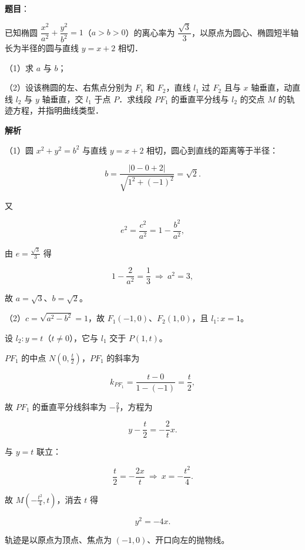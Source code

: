 \begin{answer}

\textbf{题目}：

已知椭圆 $\dfrac{x^2}{a^2}+\dfrac{y^2}{b^2}=1$（$a>b>0$）的离心率为 $\dfrac{\sqrt3}{3}$，以原点为圆心、椭圆短半轴长为半径的圆与直线 $y=x+2$ 相切．

（1）求 $a$ 与 $b$；

（2）设该椭圆的左、右焦点分别为 $F_1$ 和 $F_2$，直线 $l_1$ 过 $F_2$ 且与 $x$ 轴垂直，动直线 $l_2$ 与 $y$ 轴垂直，交 $l_1$ 于点 $P$．求线段 $PF_1$ 的垂直平分线与 $l_2$ 的交点 $M$ 的轨迹方程，并指明曲线类型．

\textbf{解析}

（1）圆 $x^2+y^2=b^2$ 与直线 $y=x+2$ 相切，圆心到直线的距离等于半径：

\nopagebreak[4]
\[b=\frac{|0-0+2|}{\sqrt{1^2+(-1)^2}}=\sqrt2 .\]

又

\nopagebreak[4]
\[e^2=\frac{c^2}{a^2}=1-\frac{b^2}{a^2},\]

由 $e=\frac{\sqrt3}{3}$ 得

\nopagebreak[4]
\[1-\frac{2}{a^2}=\frac13\ \Longrightarrow\ a^2=3,\]

故 $a=\sqrt3$、$b=\sqrt2$。

（2）$c=\sqrt{a^2-b^2}=1$，故 $F_1(-1,0)$、$F_2(1,0)$，且 $l_1:x=1$。

设 $l_2:y=t$（$t\neq0$），它与 $l_1$ 交于 $P(1,t)$。

$PF_1$ 的中点 $N\left(0,\frac t2\right)$，$PF_1$ 的斜率为

\nopagebreak[4]
\[k_{PF_1}=\frac{t-0}{1-(-1)}=\frac t2,\]

故 $PF_1$ 的垂直平分线斜率为 $-\frac2t$，方程为

\nopagebreak[4]
\[y-\frac t2=-\frac2t x .\]

与 $y=t$ 联立：

\nopagebreak[4]
\[\frac t2=-\frac{2x}{t}\ \Longrightarrow\ x=-\frac{t^2}{4} .\]

故 $M\left(-\frac{t^2}{4},t\right)$，消去 $t$ 得

\nopagebreak[4]
\[y^2=-4x .\]

轨迹是以原点为顶点、焦点为 $(-1,0)$、开口向左的抛物线。


\end{answer}
